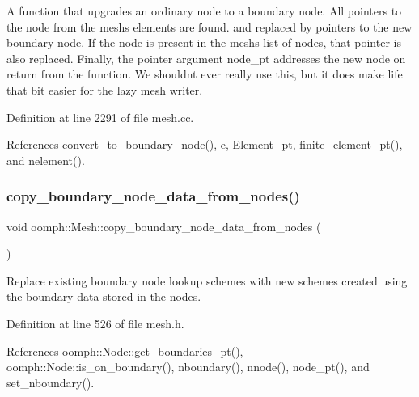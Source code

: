A function that upgrades an ordinary node to a boundary node. All pointers to the node from the mesh\textquotesingle{}s elements are found. and replaced by pointers to the new boundary node. If the node is present in the mesh\textquotesingle{}s list of nodes, that pointer is also replaced. Finally, the pointer argument node\+\_\+pt addresses the new node on return from the function. We shouldn\textquotesingle{}t ever really use this, but it does make life that bit easier for the lazy mesh writer. 

Definition at line 2291 of file mesh.\+cc.



References convert\+\_\+to\+\_\+boundary\+\_\+node(), e, Element\+\_\+pt, finite\+\_\+element\+\_\+pt(), and nelement().

\mbox{\label{classoomph_1_1Mesh_a67b93ac3809bcc1fe3220c46f417682f}} 
\subsubsection{\texorpdfstring{copy\+\_\+boundary\+\_\+node\+\_\+data\+\_\+from\+\_\+nodes()}{copy\_boundary\_node\_data\_from\_nodes()}}
{\footnotesize\ttfamily void oomph\+::\+Mesh\+::copy\+\_\+boundary\+\_\+node\+\_\+data\+\_\+from\+\_\+nodes (\begin{DoxyParamCaption}{ }\end{DoxyParamCaption})\hspace{0.3cm}{\ttfamily [inline]}}

Replace existing boundary node lookup schemes with new schemes created using the boundary data stored in the nodes. 

Definition at line 526 of file mesh.\+h.



References oomph\+::\+Node\+::get\+\_\+boundaries\+\_\+pt(), oomph\+::\+Node\+::is\+\_\+on\+\_\+boundary(), nboundary(), nnode(), node\+\_\+pt(), and set\+\_\+nboundary().

\mbox{\label{classoomph_1_1Mesh_ab065ae63fb5df883bdf6bd1dfe112b9c}} 
